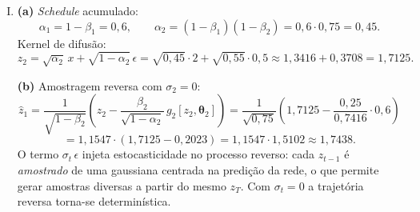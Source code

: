 \documentclass{dlproblemset}
\newcommand{\thetav}{\boldsymbol{\theta}}
\begin{document}
\begin{enumerate}[I)]
    \item \textbf{(a)} \textit{Schedule} acumulado:
    \[
    \alpha_1 = 1 - \beta_1 = 0{,}6, \qquad \alpha_2 = (1 - \beta_1)(1 - \beta_2) = 0{,}6 \cdot 0{,}75 = 0{,}45.
    \]
    Kernel de difusão:
    \[
    z_2 = \sqrt{\alpha_2}\,x + \sqrt{1 - \alpha_2}\,\epsilon = \sqrt{0{,}45} \cdot 2 + \sqrt{0{,}55} \cdot 0{,}5 \approx 1{,}3416 + 0{,}3708 = 1{,}7125.
    \]

    \textbf{(b)} Amostragem reversa com $\sigma_2 = 0$:
    \[
    \hat{z}_1 = \frac{1}{\sqrt{1 - \beta_2}}\left(z_2 - \frac{\beta_2}{\sqrt{1 - \alpha_2}}\,g_2[z_2, \thetav_2]\right)
    = \frac{1}{\sqrt{0{,}75}}\left(1{,}7125 - \frac{0{,}25}{0{,}7416} \cdot 0{,}6\right)
    \]
    \[
    = 1{,}1547 \cdot (1{,}7125 - 0{,}2023) = 1{,}1547 \cdot 1{,}5102 \approx 1{,}7438.
    \]
    O termo $\sigma_t\,\epsilon$ injeta estocasticidade no processo reverso: cada $z_{t-1}$ é \emph{amostrado} de uma gaussiana centrada na predição da rede, o que permite gerar amostras diversas a partir do mesmo $z_T$. Com $\sigma_t = 0$ a trajetória reversa torna-se determinística.
\end{enumerate}
\color{black}
\end{document}
